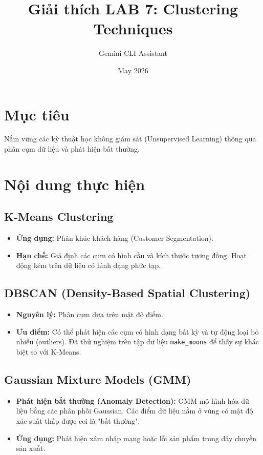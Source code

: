 \documentclass{article}
\title{Giải thích LAB 7: Clustering Techniques}
\author{Gemini CLI Assistant}
\date{May 2026}
\begin{document}
\maketitle

\section{Mục tiêu}
Nắm vững các kỹ thuật học không giám sát (Unsupervised Learning) thông qua phân cụm dữ liệu và phát hiện bất thường.

\section{Nội dung thực hiện}

\subsection{K-Means Clustering}
\begin{itemize}
    \item \textbf{Ứng dụng:} Phân khúc khách hàng (Customer Segmentation).
    \item \textbf{Hạn chế:} Giả định các cụm có hình cầu và kích thước tương đồng. Hoạt động kém trên dữ liệu có hình dạng phức tạp.
\end{itemize}

\subsection{DBSCAN (Density-Based Spatial Clustering)}
\begin{itemize}
    \item \textbf{Nguyên lý:} Phân cụm dựa trên mật độ điểm.
    \item \textbf{Ưu điểm:} Có thể phát hiện các cụm có hình dạng bất kỳ và tự động loại bỏ nhiễu (outliers). Đã thử nghiệm trên tập dữ liệu \texttt{make\_moons} để thấy sự khác biệt so với K-Means.
\end{itemize}

\subsection{Gaussian Mixture Models (GMM)}
\begin{itemize}
    \item \textbf{Phát hiện bất thường (Anomaly Detection):} GMM mô hình hóa dữ liệu bằng các phân phối Gaussian. Các điểm dữ liệu nằm ở vùng có mật độ xác suất thấp được coi là "bất thường".
    \item \textbf{Ứng dụng:} Phát hiện xâm nhập mạng hoặc lỗi sản phẩm trong dây chuyền sản xuất.
\end{itemize}
\end{document}

